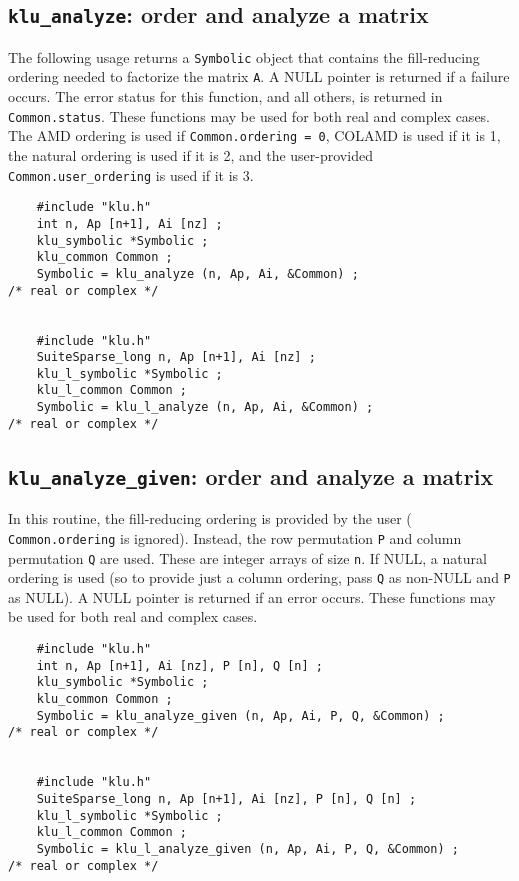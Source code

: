\documentclass[11pt]{article}
\begin{document}
\subsection{{\tt klu\_analyze}: order and analyze a matrix}

The following usage returns a {\tt Symbolic} object that contains the
fill-reducing ordering needed to factorize the matrix {\tt A}.  A NULL pointer
is returned if a failure occurs.  The error status for this function, and all
others, is returned in {\tt Common.status}.  These functions may be used for
both real and complex cases.  The AMD ordering is used if {\tt Common.ordering
= 0}, COLAMD is used if it is 1, the natural ordering is used if it is 2, and
the user-provided {\tt Common.user\_ordering} is used if it is 3.

{\footnotesize
\begin{verbatim}
    #include "klu.h"
    int n, Ap [n+1], Ai [nz] ;
    klu_symbolic *Symbolic ;
    klu_common Common ;
    Symbolic = klu_analyze (n, Ap, Ai, &Common) ;                             /* real or complex */


    #include "klu.h"
    SuiteSparse_long n, Ap [n+1], Ai [nz] ;
    klu_l_symbolic *Symbolic ;
    klu_l_common Common ;
    Symbolic = klu_l_analyze (n, Ap, Ai, &Common) ;                           /* real or complex */
\end{verbatim}
}

\subsection{{\tt klu\_analyze\_given}: order and analyze a matrix}

In this routine, the fill-reducing ordering is provided by the user ({\tt
Common.ordering} is ignored).  Instead, the row permutation {\tt P} and column
permutation {\tt Q} are used.  These are integer arrays of size {\tt n}.  If
NULL, a natural ordering is used (so to provide just a column ordering, pass
{\tt Q} as non-NULL and {\tt P} as NULL).  A NULL pointer is returned if an
error occurs.  These functions may be used for both real and complex cases.

{\footnotesize
\begin{verbatim}
    #include "klu.h"
    int n, Ap [n+1], Ai [nz], P [n], Q [n] ;
    klu_symbolic *Symbolic ;
    klu_common Common ;
    Symbolic = klu_analyze_given (n, Ap, Ai, P, Q, &Common) ;                 /* real or complex */


    #include "klu.h"
    SuiteSparse_long n, Ap [n+1], Ai [nz], P [n], Q [n] ;
    klu_l_symbolic *Symbolic ;
    klu_l_common Common ;
    Symbolic = klu_l_analyze_given (n, Ap, Ai, P, Q, &Common) ;               /* real or complex */
\end{verbatim}
}
\end{document}
